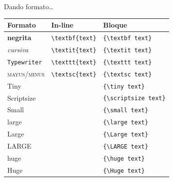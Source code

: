 \begin{frame}{Dando formato\ldots{}}
    \centering
    \begin{tabular}{l l l}
        Formato & In-line & Bloque\\\hline
        \textbf{negrita} & \texttt{\textbackslash textbf\{text\}} & \texttt{\{\textbackslash textbf text\}}\\
        \textit{cursiva} & \texttt{\textbackslash textit\{text\}} & \texttt{\{\textbackslash textit text\}}\\
        \texttt{Typewriter} & \texttt{\textbackslash texttt\{text\}} & \texttt{\{\textbackslash texttt text\}}\\
        \textsc{mayus/minus} & \texttt{\textbackslash textsc\{text\}} & \texttt{\{\textbackslash textsc text\}}\\\hline \pause
        {\tiny Tiny} & & \texttt{\{\textbackslash tiny text\}}\\
        {\scriptsize Scriptsize} & & \texttt{\{\textbackslash scriptsize text\}}\\
        {\small Small} & & \texttt{\{\textbackslash small text\}}\\
        {\large large} & & \texttt{\{\textbackslash large text\}}\\
        {\Large Large} & & \texttt{\{\textbackslash Large text\}}\\
        {\Large LARGE} & & \texttt{\{\textbackslash LARGE text\}}\\
        {\huge huge} & & \texttt{\{\textbackslash huge text\}}\\
        {\Huge Huge} & & \texttt{\{\textbackslash Huge text\}}
    \end{tabular}
\end{frame}


